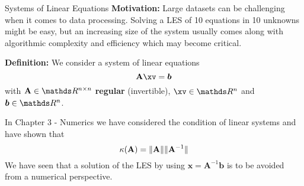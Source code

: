 
\begin{vbframe}{Systems of Linear Equations}
\textbf{Motivation:}
Large datasets can be challenging when it comes to data processing. Solving a LES of 10 equations in 10 unknowns might be easy, but an increasing size of the system usually comes along with algorithmic complexity and efficiency which may become critical.

\lz
\vspace*{-0.1cm}
\textbf{Definition:}
We consider a system of linear equations 
\vspace*{-0.1cm}
$$
\Amat \xv = \boldsymbol{b}
$$
\vspace*{-0.1cm}
with $\Amat \in \R^{n \times n}$ \textbf{regular} (invertible), $\xv \in \R^n$ and $\boldsymbol{b} \in \R^n$.

\lz

In Chapter 3 - Numerics we have considered the condition of linear systems and have shown that
\vspace*{-0.2cm}
$$
\kappa(\mathbf{A}) = \|\mathbf{A}\|\|\mathbf{A}^{-1}\|
$$
We have seen that a solution of the LES by using $\bm{x} = \bm{A}^{-1}\bm{b}$ is to be avoided from a numerical perspective. 






\end{vbframe}
